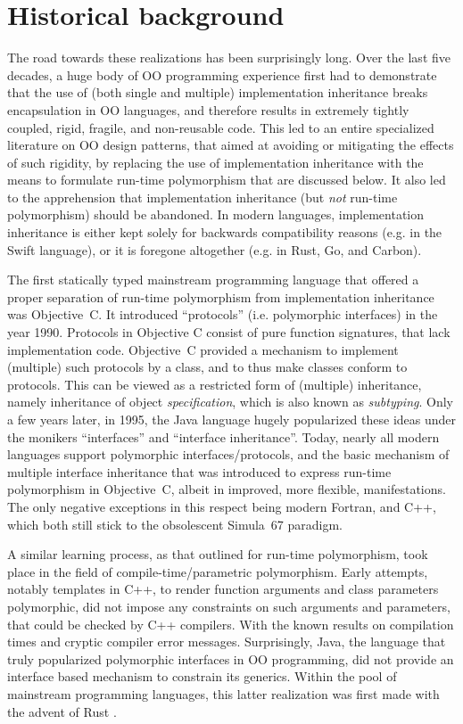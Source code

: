 \documentclass[11pt,oneside]{report}
\begin{document}
\section{Historical background}

The road towards these realizations has been surprisingly long. Over
the last five decades, a huge body of OO programming experience first
had to demonstrate that the use of (both single and multiple)
implementation inheritance breaks encapsulation in OO languages, and
therefore results in extremely tightly coupled, rigid, fragile, and
non-reusable code. This led to an entire specialized literature on OO
design patterns, that aimed at avoiding or mitigating the effects of
such rigidity, by replacing the use of implementation inheritance with
the means to formulate run-time polymorphism that are discussed
below. It also led to the apprehension that implementation inheritance
(but \emph{not} run-time polymorphism) should be abandoned. In modern
languages, implementation inheritance is either kept solely for
backwards compatibility reasons (e.g. in the Swift language), or it is
foregone altogether (e.g. in Rust, Go, and Carbon).

The first statically typed mainstream programming language that
offered a proper separation of run-time polymorphism from
implementation inheritance was Objective~C. It introduced
``protocols'' (i.e. polymorphic interfaces) in the year
1990. Protocols in Objective C consist of pure function signatures,
that lack implementation code. Objective~C provided a mechanism to
implement (multiple) such protocols by a class, and to thus make
classes conform to protocols. This can be viewed as a restricted form
of (multiple) inheritance, namely inheritance of object
\emph{specification}, which is also known as \emph{subtyping}. Only a
few years later, in 1995, the Java language hugely popularized these
ideas under the monikers ``interfaces'' and ``interface
inheritance''. Today, nearly all modern languages support polymorphic
interfaces/protocols, and the basic mechanism of multiple interface
inheritance that was introduced to express run-time polymorphism in
Objective~C, albeit in improved, more flexible, manifestations. The
only negative exceptions in this respect being modern Fortran, and
C++, which both still stick to the obsolescent Simula~67 paradigm.

A similar learning process, as that outlined for run-time
polymorphism, took place in the field of compile-time/parametric
polymorphism. Early attempts, notably templates in C++, to render
function arguments and class parameters polymorphic, did not impose
any constraints on such arguments and parameters, that could be
checked by C++ compilers. With the known results on compilation times
and cryptic compiler error messages. Surprisingly, Java, the language
that truly popularized polymorphic interfaces in OO programming, did
not provide an interface based mechanism to constrain its
generics. Within the pool of mainstream programming languages, this
latter realization was first made with the advent of Rust
\cite{Matsakis_2014}.
\end{document}
